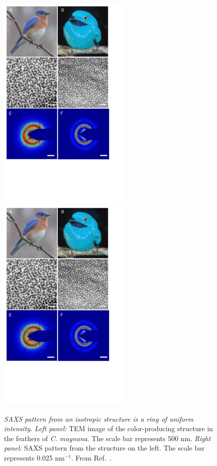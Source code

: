 \begin{figure}[htbp]
\centering
\includegraphics[width=2.5in]{figures/cmaynanaTEM.pdf}
\hspace{0.5in}
\includegraphics[width=2.5in]{figures/cmaynanaSAXS.pdf}
\caption{\label{fig:cotingaSAXS} \emph{SAXS pattern from an isotropic structure is a ring of uniform intensity.}
	\emph{Left panel:} TEM image of the color-producing structure in the feathers of \emph{C. maynana}.
	The scale bar represents 500 nm.
	\emph{Right panel:} SAXS pattern from the structure on the left.
	The scale bar represents 0.025 nm$^{-1}$.
	From Ref.~\cite{Dufresne:2009p6342}.}
\end{figure}

